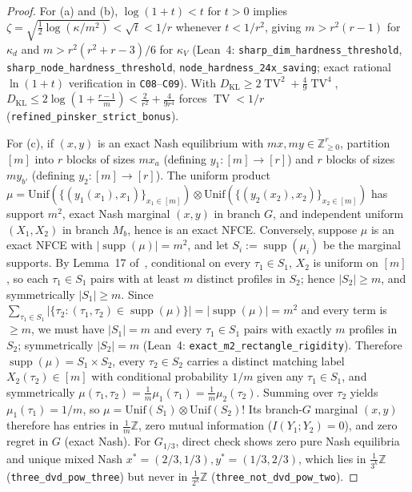 \documentclass[11pt,a4paper]{article}
\theoremstyle{remark}
\newcommand{\supp}{\operatorname{supp}}
\newcommand{\TV}{\operatorname{TV}}
\newcommand{\DKL}{D_{\mathrm{KL}}}
\newcommand{\Unif}{\mathrm{Unif}}
\newcommand{\Z}{\mathbb{Z}}
\begin{document}
\begin{proof}
For (a) and (b), $\log(1+t) < t$ for $t > 0$ implies $\zeta = \sqrt{\frac{1}{2}\log(\kappa/m^2)} < \sqrt{t} < 1/r$ whenever $t < 1/r^2$, giving $m > r^2(r-1)$ for $\kappa_d$ and $m > r^2(r^2+r-3)/6$ for $\kappa_V$ (Lean~4: \nolinkurl{sharp_dim_hardness_threshold}, \nolinkurl{sharp_node_hardness_threshold}, \nolinkurl{node_hardness_24x_saving}; exact rational $\ln(1+t)$ verification in \texttt{C08}--\texttt{C09}). With $\DKL \ge 2\TV^2 + \frac{4}{9}\TV^4$, $\DKL \le 2\log(1+\frac{r-1}{m}) < \frac{2}{r^2} + \frac{4}{9r^4}$ forces $\TV < 1/r$ (\nolinkurl{refined_pinsker_strict_bonus}).

For (c), if $(x,y)$ is an exact Nash equilibrium with $mx, my \in \Z_{\ge 0}^r$, partition $[m]$ into $r$ blocks of sizes $m x_a$ (defining $y_1: [m]\to[r]$) and $r$ blocks of sizes $m y_{b'}$ (defining $y_2: [m]\to[r]$). The uniform product $\mu = \Unif(\{(y_1(x_1),x_1)\}_{x_1\in[m]}) \otimes \Unif(\{(y_2(x_2),x_2)\}_{x_2\in[m]})$ has support $m^2$, exact Nash marginal $(x,y)$ in branch $G$, and independent uniform $(X_1,X_2)$ in branch $M_b$, hence is an exact NFCE. Conversely, suppose $\mu$ is an exact NFCE with $|\supp(\mu)| = m^2$, and let $S_i := \supp(\mu_i)$ be the marginal supports. By Lemma~17 of~\cite{CHPS2026}, conditional on every $\tau_1 \in S_1$, $X_2$ is uniform on $[m]$, so each $\tau_1 \in S_1$ pairs with at least $m$ distinct profiles in $S_2$; hence $|S_2| \ge m$, and symmetrically $|S_1| \ge m$. Since $\sum_{\tau_1 \in S_1} |\{\tau_2 : (\tau_1,\tau_2)\in\supp(\mu)\}| = |\supp(\mu)| = m^2$ and every term is $\ge m$, we must have $|S_1| = m$ and every $\tau_1 \in S_1$ pairs with exactly $m$ profiles in $S_2$; symmetrically $|S_2| = m$ (Lean~4: \nolinkurl{exact_m2_rectangle_rigidity}). Therefore $\supp(\mu) = S_1 \times S_2$, every $\tau_2 \in S_2$ carries a distinct matching label $X_2(\tau_2) \in [m]$ with conditional probability $1/m$ given any $\tau_1 \in S_1$, and symmetrically $\mu(\tau_1,\tau_2) = \frac{1}{m}\mu_1(\tau_1) = \frac{1}{m}\mu_2(\tau_2)$. Summing over $\tau_2$ yields $\mu_1(\tau_1) = 1/m$, so $\mu = \Unif(S_1) \otimes \Unif(S_2)$! Its branch-$G$ marginal $(x,y)$ therefore has entries in $\frac{1}{m}\Z$, zero mutual information ($I(Y_1;Y_2) = 0$), and zero regret in $G$ (exact Nash). For $G_{1/3}$, direct check shows zero pure Nash equilibria and unique mixed Nash $x^* = (2/3, 1/3), y^* = (1/3, 2/3)$, which lies in $\frac{1}{3^k}\Z$ (\nolinkurl{three_dvd_pow_three}) but never in $\frac{1}{2^k}\Z$ (\nolinkurl{three_not_dvd_pow_two}).
\end{proof}
\end{document}
